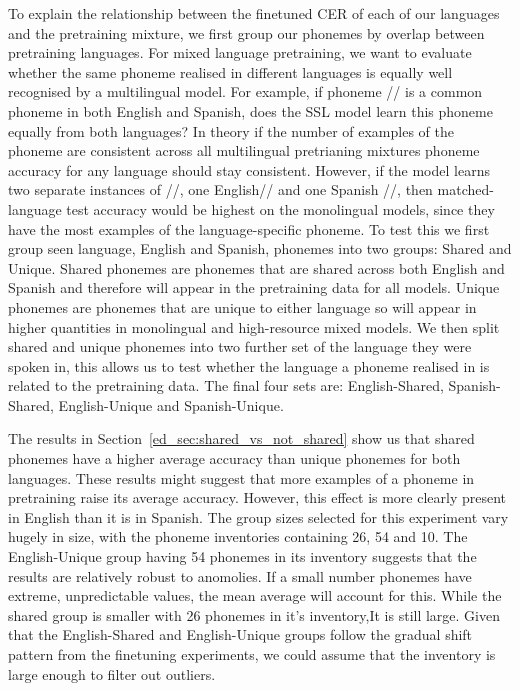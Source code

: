 To explain the relationship between the finetuned CER of each of our languages and the pretraining mixture, we first group our phonemes by overlap between pretraining languages. For mixed language pretraining, we want to evaluate whether the same phoneme realised in different languages is equally well recognised by a multilingual model. For example, if phoneme // is a common phoneme in both English and Spanish, does the SSL model learn this phoneme equally from both languages? In theory if the number of examples of the phoneme are consistent across all multilingual pretrianing mixtures phoneme accuracy for any language should stay consistent. However, if the model learns two separate instances of //, one English// and one Spanish //, then matched-language test accuracy would be highest on the monolingual models, since they have the most examples of the language-specific phoneme. To test this we first group seen language, English and Spanish, phonemes into two groups: Shared and Unique. Shared phonemes are phonemes that are shared across both English and Spanish and therefore will appear in the pretraining data for all models. Unique phonemes are phonemes that are unique to either language so will appear in higher quantities in monolingual and high-resource mixed models. We then split shared and unique phonemes into two further set of the language they were spoken in, this allows us to test whether the language a phoneme realised in is related to the pretraining data. The final four sets are: English-Shared, Spanish-Shared, English-Unique and Spanish-Unique.   

The results in Section~\ref{ed_sec:shared_vs_not_shared} show us that shared phonemes have a higher average accuracy than unique phonemes for both languages. These results might suggest that more examples of a phoneme in pretraining raise its average accuracy. However, this effect is more clearly present in English than it is in Spanish. The group sizes selected for this experiment vary hugely in size, with the phoneme inventories containing 26, 54 and 10. The English-Unique group having 54 phonemes in its inventory suggests that the results are relatively robust to anomolies. If a small number phonemes have extreme, unpredictable values, the mean average will account for this. While the shared group is smaller with 26 phonemes in it's inventory,It is still large. Given that the English-Shared and English-Unique groups follow the gradual shift pattern from the finetuning experiments, we could assume that the inventory is large enough to filter out outliers.

